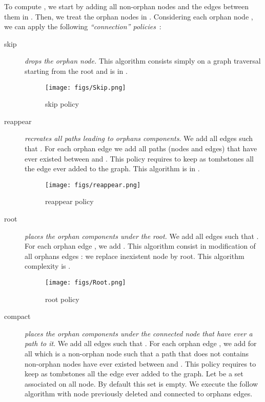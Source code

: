 \documentclass[a4paper]{article}
\begin{document}
To compute , we start by adding all non-orphan nodes and
the edges between them in . Then, we treat the orphan
nodes in . Considering each orphan node , we can apply the
following {\em ``connection'' policies}~:

\begin{description}
\item[skip] {\em drops the orphan node.} This algorithm consists
  simply on a graph traversal starting from the root and is in
  .


\begin{figure}[H] 
\centering
\texttt{[image: figs/Skip.png]} 
\caption{skip policy}
\label{fig:Skip} 
\end{figure} 


\item[reappear] {\em recreates all paths leading to orphans
    components}. We add all edges  such that .  For
  each orphan edge  we add all paths (nodes and edges) that
  have ever existed between  and .  This policy requires to
  keep as tombstones all the edge ever added to the graph.  This
  algorithm is in .


\begin{figure}[H] 
\centering
\texttt{[image: figs/reappear.png]} 
\caption{reappear policy}
\label{fig:Reappear} 
\end{figure} 

  






\item[root] {\em places the orphan components under the root.} We add
  all edges  such that . For each orphan edge , we add .  This algorithm consist in modification of
  all orphans edges : we replace inexistent node by root.  This
  algorithm complexity is .





\begin{figure}[H] 
\centering
\texttt{[image: figs/Root.png]} 
\caption{root policy}
\label{fig:Root} 
\end{figure} 


 
\item[compact] {\em places the orphan components under the connected
    node that have ever a path to it}. We add all edges 
  such that . For each orphan edge , we add  for all  which is a non-orphan node such that a path that does
  not contains non-orphan nodes have ever existed between  and .
  This policy requires to keep as tombstones all the edge ever added
  to the graph.  Let  be a set associated on all node. By default
  this set is empty. We execute the follow
  algorithm with node previously deleted and connected to orphans edges.


\end{description}
\end{document}
